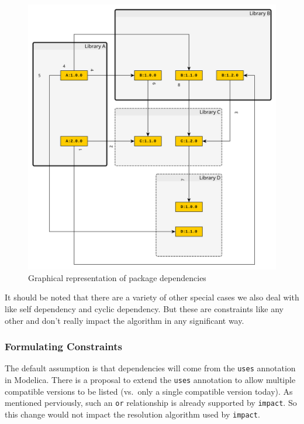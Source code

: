 \documentclass[11pt,a4paper,twocolumn]{article}
\newcommand{\code}[1]{\texttt{#1}} %
\begin{document}
\begin{figure}[!ht]
  \centering
  \includegraphics[width=\columnwidth]{fig/complex_case}
  \caption{Graphical representation of package dependencies}\label{fig:deps}
\end{figure}


It should be noted that there are a variety of other special cases we
also deal with like self dependency and cyclic dependency.  But these
are constraints like any other and don't really impact the algorithm
in any significant way.

\subsubsection{Formulating Constraints}

The default assumption is that dependencies will come from the
\code{uses} annotation in Modelica.  There is a proposal to extend the
\code{uses} annotation to allow multiple compatible versions to be
listed (vs.\ only a single compatible version today).  As mentioned
perviously, such an \code{or} relationship is already supported by
\code{impact}.  So this change would not impact the resolution
algorithm used by \code{impact}.
\end{document}
